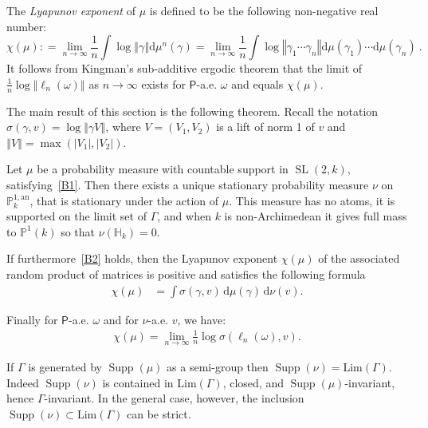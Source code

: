 \documentclass[AHL,Unicode,longabstracts]{cedram}
\DeclareMathOperator{\supp}{Supp}
\DeclareMathOperator{\SL}{SL}
\newcommand{\hh}{\mathbb{H}}
\newcommand{\prob}{\mathsf{P}}
\newcommand{\norm}[1]{\left\Vert#1\right\Vert}
\newcommand{\abs}[1]{\left\vert#1\right\vert}
\newcommand{\PP}{\mathbb{P}}
\newcommand{\berk}{{\mathbb{P}^{1, \mathrm{an}}_k}}
\newcommand{\SLk}{\SL(2,k)}
\newcommand*{\dd}{\mathrm{d}}
\newcommand*{\dmu}{\dd \mu}
\newcommand*{\dnu}{\dd \nu}
\begin{document}
The \emph{Lyapunov exponent} of $\mu$ is defined to be the following non-negative real number:
\begin{equation}\label{def:lyapunov exponent}
\chi (\mu) : = \lim _{n\rightarrow \infty} \frac{1}{n}\int
\log \norm{\gamma} \dmu^{n}(\gamma) = \lim _{n\rightarrow \infty} \frac{1}{n}\int \log \norm{ \gamma_1\cdots
\gamma_n} \dmu(\gamma_1)\cdots \dmu(\gamma_n)~.
\end{equation}
It follows from Kingman's sub-additive ergodic theorem that the limit of $ \frac1n \log \norm {\ell_n(\omega)}$ as $n\to\infty$ exists for $\prob$-a.e. $\omega$ and equals $\chi(\mu)$.


The main result of this section is the following theorem. Recall the notation $\sigma(\gamma, v) = \log\norm{\gamma V}$, where $V = (V_1, V_2)$ is a lift of norm 1 of $v$ and $\norm{V} = \max(\abs{V_1}, \abs{V_2})$.

\begin{theo}\label{thm:positive}
Let $\mu$ be a probability measure with countable support in $\SLk$, satisfying~\eqref{B1}. Then there exists a unique stationary probability measure $\nu$ on $\berk$, that is stationary under the action of $\mu$. This measure has no atoms, it is supported on the limit set of $\Gamma$, and when $k$ is non-Archimedean it gives full mass to $\PP^1(k)$ so that $\nu (\hh_k)=0$.

If furthermore~\eqref{B2} holds, then the Lyapunov exponent $\chi(\mu)$ of the associated random product of matrices is positive and satisfies the following formula
\begin{align}\label{eq:furstenberg}
\chi(\mu) & = \int \sigma(\gamma, v) \, \dmu(\gamma)\, \dnu(v).
\end{align}

Finally for $\prob$-a.e. $\omega$ and for $\nu$-a.e. $v$, we have:
\begin{align}
\chi(\mu) = \lim_{n\to\infty} \frac1n \log \sigma(\ell_n(\omega), v) \label{eq301}
.
\end{align}
\end{theo}

\begin{rema}
If $\Gamma$ is generated by $\supp(\mu)$ as a semi-group then $\supp(\nu) = \mathrm{Lim}(\Gamma)$. Indeed $\supp(\nu)$ is contained in $\mathrm{Lim}(\Gamma)$, closed, and $\supp(\mu)$-invariant, hence $\Gamma$-invariant. In the general case, however, the inclusion $\supp(\nu)\subset \mathrm{Lim}(\Gamma)$ can be strict.
\end{rema}
\end{document}
